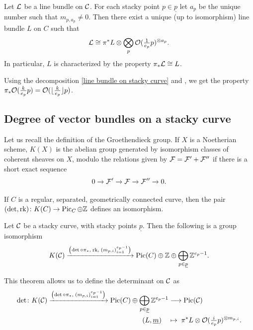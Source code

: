 \begin{thm}\cites[Corollary 3.2.1]{Cadman}[Corollary 1.2.11]{Taams} \label{picard group stacky curve}
Let $\mathcal{L}$ be a line bundle on $\mathcal{C}$. For each stacky point $p \in \underline{p}$ let $a_p$ be the unique number such that $m_{p, a_p}\neq 0 $. Then there exist a unique (up to isomorphism) line bundle $L$ on $C$ such that
\begin{equation}\label{line bundle on stacky curve}
\mathcal{L} \cong \pi^*L \otimes \bigotimes_p \mathcal{O}(\tfrac{1}{e_p}p)^{\otimes a_p}.
\end{equation}
In particular, $L$ is characterized by the property $\pi_* \mathcal{L} \cong L$.
\end{thm}

\begin{rmk}
Using the decomposition \eqref{line bundle on stacky curve} and , we get the property $\pi_* \mathcal{O}(\tfrac{k}{e_p}p) = \mathcal{O}( \lfloor \tfrac{k}{e_p} \rfloor p )$.
\end{rmk}

\subsection{Degree of vector bundles on a stacky curve} \label{subsection: Degree of vector bundles on a stacky curve}

Let us recall the definition of the Groethendieck group.
If $X$ is a Noetherian scheme, $K(X)$ is the abelian group generated by isomorphism classes of coherent sheaves on $X$, modulo the relations given by $\mathcal{F} = \mathcal{F'} + \mathcal{F''}$ if there is a short exact sequence
\[
0 \to \mathcal{F'} \to \mathcal{F} \to \mathcal{F''} \to 0.
\]

\begin{thm}
If $C$ is a regular, separated, geometrically connected curve, then the pair $(\det, \operatorname{rk})\colon K(C) \to \operatorname{Pic}_C \oplus \mathbb{Z} $ defines an isomorphism.
\end{thm}

\begin{thm}\cite[Theorem 1.2.27]{Taams}
Let $\mathcal{C}$ be a stacky curve, with stacky points $\underline{p}$. Then the following is a group isomorphism
\[
K(\mathcal{C}) \xrightarrow{\left(\det \circ \pi_*, \; \operatorname{rk}, \; (m_{p, i})_{i=1}^{e_p-1}\right)} \operatorname{Pic}(C) \oplus \mathbb{Z} \oplus \bigoplus_{p \in \underline{p}} \mathbb{Z}^{e_p-1}.
\]
\end{thm}

\begin{defi}\cite[Definition 1.2.28]{Taams}
This theorem allows us to define the determinant on $\mathcal{C}$ as
\begin{align}
	\det \colon K(\mathcal{C}) \xrightarrow{\left(\det \circ \pi_*, \; (m_{p, i})_{i=1}^{e_p-1}\right)} \operatorname{Pic}(C) \oplus \bigoplus_{p \in \underline{p}} \mathbb{Z}^{e_p-1} &\longrightarrow \operatorname{Pic}(\mathcal{C}) \\
	(L, \underline{m}) \quad &\mapsto \; \pi^*L \otimes \mathcal{O}(\tfrac{i}{e_p}p)^{\otimes m_{p,i}}.
\end{align}
\end{defi}

